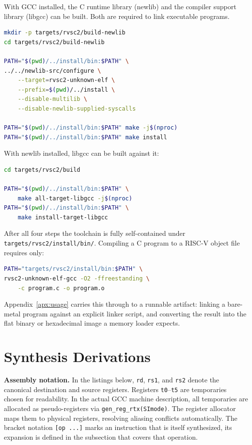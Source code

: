 With GCC installed, the C runtime library (newlib) and the compiler support library (libgcc) can be
built. Both are required to link executable programs.

\begin{lstlisting}[language=bash]
mkdir -p targets/rvsc2/build-newlib
cd targets/rvsc2/build-newlib

PATH="$(pwd)/../install/bin:$PATH" \
../../newlib-src/configure \
    --target=rvsc2-unknown-elf \
    --prefix=$(pwd)/../install \
    --disable-multilib \
    --disable-newlib-supplied-syscalls

PATH="$(pwd)/../install/bin:$PATH" make -j$(nproc)
PATH="$(pwd)/../install/bin:$PATH" make install
\end{lstlisting}

With newlib installed, libgcc can be built against it:

\begin{lstlisting}[language=bash]
cd targets/rvsc2/build

PATH="$(pwd)/../install/bin:$PATH" \
    make all-target-libgcc -j$(nproc)
PATH="$(pwd)/../install/bin:$PATH" \
    make install-target-libgcc
\end{lstlisting}

After all four steps the toolchain is fully self-contained under \nolinkurl{targets/rvsc2/install/bin/}.
Compiling a C program to a RISC-V object file requires only:

\begin{lstlisting}[language=bash]
PATH="targets/rvsc2/install/bin:$PATH" \
rvsc2-unknown-elf-gcc -O2 -ffreestanding \
    -c program.c -o program.o
\end{lstlisting}

Appendix~\ref{apx:usage} carries this through to a runnable artifact: linking a bare-metal
program against an explicit linker script, and converting the result into the flat binary or
hexadecimal image a memory loader expects.

\section{Synthesis Derivations} \label{sec:sc1-synthesis}

\textbf{Assembly notation.} In the listings below, \texttt{rd}, \texttt{rs1}, and \texttt{rs2} denote
the canonical destination and source registers. Registers \texttt{t0}--\texttt{t5} are temporaries
chosen for readability. In the actual GCC machine description, all temporaries are allocated as
pseudo-registers via \texttt{gen\_reg\_rtx(SImode)}. The register allocator maps them to physical
registers, resolving aliasing conflicts automatically. The bracket notation \texttt{[op ...]} marks
an instruction that is itself synthesized, its expansion is defined in the subsection that covers that
operation.

